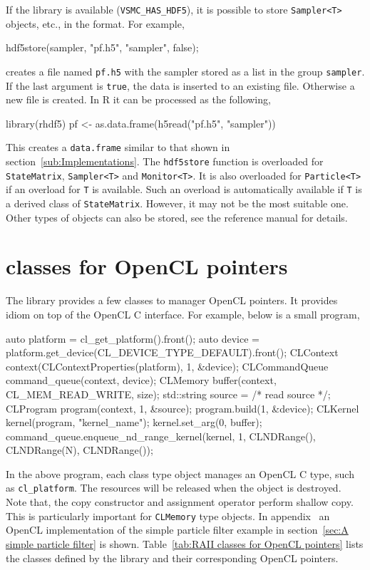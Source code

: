 If the \hdf library is available (\verb|VSMC_HAS_HDF5|), it is possible to
store \verb|Sampler<T>| objects, etc., in the \hdf format. For example,
\begin{cppcode}
  hdf5store(sampler, "pf.h5", "sampler", false);
\end{cppcode}
creates a \hdf file named \verb|pf.h5| with the sampler stored as a list in the
group \verb|sampler|. If the last argument is \verb|true|, the data is inserted
to an existing file. Otherwise a new file is created. In R it can be processed
as the following,
\begin{rcode}
  library(rhdf5)
  pf <- as.data.frame(h5read("pf.h5", "sampler"))
\end{rcode}
This creates a \verb|data.frame| similar to that shown in
section~\ref{sub:Implementations}. The \verb|hdf5store| function is overloaded
for \verb|StateMatrix|, \verb|Sampler<T>| and \verb|Monitor<T>|. It is also
overloaded for \verb|Particle<T>| if an overload for \verb|T| is available.
Such an overload is automatically available if \verb|T| is a derived class of
\verb|StateMatrix|. However, it may not be the most suitable one. Other types
of objects can also be stored, see the reference manual for details.

\section{\protect\raii classes for OpenCL pointers}
\label{sec:RAII classes for OpenCL pointers}

The library provides a few classes to manager OpenCL pointers. It provides
\raii idiom on top of the OpenCL C interface. For example, below is a small
program,
\begin{cppcode}
  auto platform = cl_get_platform().front();
  auto device = platform.get_device(CL_DEVICE_TYPE_DEFAULT).front();
  CLContext context(CLContextProperties(platform), 1, &device);
  CLCommandQueue command_queue(context, device);
  CLMemory buffer(context, CL_MEM_READ_WRITE, size);
  std::string source = /* read source */;
  CLProgram program(context, 1, &source);
  program.build(1, &device);
  CLKernel kernel(program, "kernel_name");
  kernel.set_arg(0, buffer);
  command_queue.enqueue_nd_range_kernel(kernel, 1, CLNDRange(), CLNDRange(N),
      CLNDRange());
\end{cppcode}
In the above program, each class type object manages an OpenCL C type, such as
\verb|cl_platform|. The resources will be released when the object is
destroyed. Note that, the copy constructor and assignment operator perform
shallow copy. This is particularly important for \verb|CLMemory| type objects.
In appendix~ an OpenCL
implementation of the simple particle filter example in section~\ref{sec:A
  simple particle filter} is shown. Table~\ref{tab:RAII classes for OpenCL
  pointers} lists the classes defined by the library and their corresponding
OpenCL pointers.

